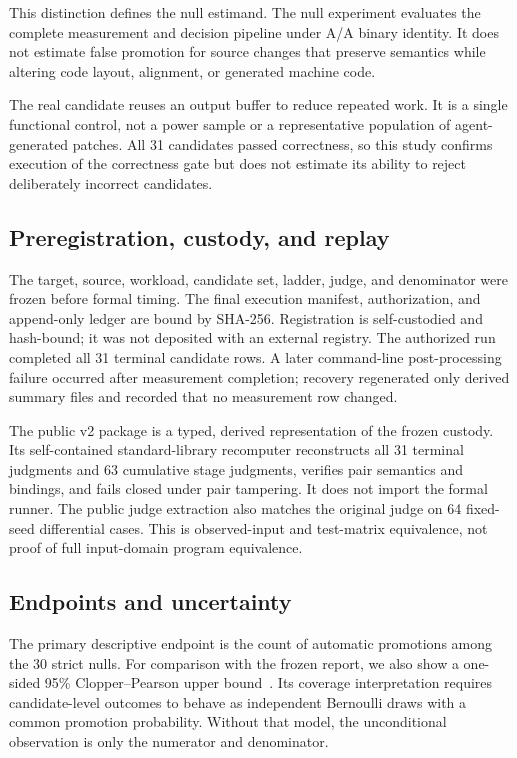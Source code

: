 \documentclass[10pt]{article}
\newcommand{\NullCount}{30}
\begin{document}
This distinction defines the null estimand.  The null experiment evaluates the
complete measurement and decision pipeline under A/A binary identity.  It does
not estimate false promotion for source changes that preserve semantics while
altering code layout, alignment, or generated machine code.

The real candidate reuses an output buffer to reduce repeated work.  It is a
single functional control, not a power sample or a representative population
of agent-generated patches.  All 31 candidates passed correctness, so this
study confirms execution of the correctness gate but does not estimate its
ability to reject deliberately incorrect candidates.

\subsection{Preregistration, custody, and replay}

The target, source, workload, candidate set, ladder, judge, and denominator
were frozen before formal timing.  The final execution manifest, authorization,
and append-only ledger are bound by SHA-256.  Registration is self-custodied
and hash-bound; it was not deposited with an external registry.  The authorized
run completed all
31 terminal candidate rows.  A later command-line post-processing failure
occurred after measurement completion; recovery regenerated only derived
summary files and recorded that no measurement row changed.

The public v2 package is a typed, derived representation of the frozen custody.
Its self-contained standard-library recomputer reconstructs all 31 terminal
judgments and 63 cumulative stage judgments, verifies pair semantics and
bindings, and fails closed under pair tampering.  It does not import the formal
runner.  The public judge extraction also matches the original judge on 64
fixed-seed differential cases.  This is observed-input and test-matrix
equivalence, not proof of full input-domain program equivalence.

\subsection{Endpoints and uncertainty}

The primary descriptive endpoint is the count of automatic promotions among
the \NullCount{} strict nulls.  For comparison with the frozen report, we also
show a one-sided 95\% Clopper--Pearson upper bound~\citep{clopper1934}.  Its
coverage interpretation requires candidate-level outcomes to behave as
independent Bernoulli draws with a common promotion probability.  Without that
model, the unconditional observation is only the numerator and denominator.
\end{document}
